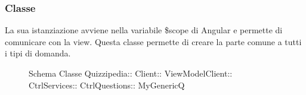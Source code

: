 \subsubsection{Classe }
La sua istanziazione avviene nella variabile \$scope di Angular e permette di comunicare con la view. Questa classe permette di creare la parte comune a tutti i tipi di domanda.
\begin{figure}[H]
\centering
\noindent{}
\caption[Schema Classe MyGenericQ]{Schema Classe Quizzipedia:: Client:: ViewModelClient:: CtrlServices:: CtrlQuestions:: MyGenericQ}
\end{figure}
